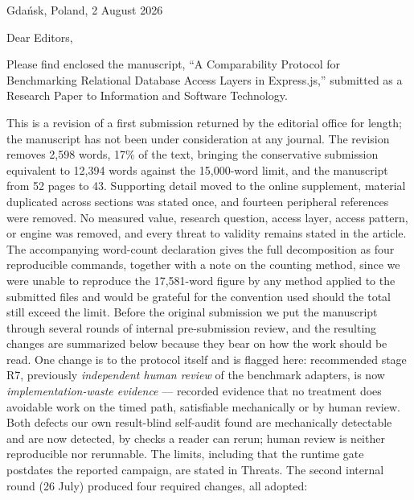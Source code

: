 \documentclass[11pt,a4paper]{article}
\begin{document}
Gdańsk, Poland, 2 August 2026

Dear Editors,

Please find enclosed the manuscript, ``A Comparability Protocol for Benchmarking Relational Database Access Layers in Express.js,'' submitted as a Research Paper to Information and Software Technology.

This is a revision of a first submission returned by the editorial office for length; the manuscript has not been under consideration at any journal. The revision removes 2,598 words, 17\% of the text, bringing the conservative submission equivalent to 12,394 words against the 15,000-word limit, and the manuscript from 52 pages to 43. Supporting detail moved to the online supplement, material duplicated across sections was stated once, and fourteen peripheral references were removed. No measured value, research question, access layer, access pattern, or engine was removed, and every threat to validity remains stated in the article. The accompanying word-count declaration gives the full decomposition as four reproducible commands, together with a note on the counting method, since we were unable to reproduce the 17,581-word figure by any method applied to the submitted files and would be grateful for the convention used should the total still exceed the limit. Before the original submission we put the manuscript through several rounds of internal pre-submission review, and the resulting changes are summarized below because they bear on how the work should be read. One change is to the protocol itself and is flagged here: recommended stage R7, previously \emph{independent human review} of the benchmark adapters, is now \emph{implementation-waste evidence} --- recorded evidence that no treatment does avoidable work on the timed path, satisfiable mechanically or by human review. Both defects our own result-blind self-audit found are mechanically detectable and are now detected, by checks a reader can rerun; human review is neither reproducible nor rerunnable. The limits, including that the runtime gate postdates the reported campaign, are stated in Threats. The second internal round (26 July) produced four required changes, all adopted:
\end{document}
